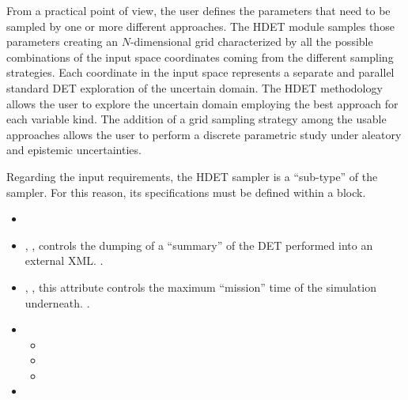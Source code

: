 From a practical point of view, the user defines the parameters that need to be
sampled by one or more different approaches.
%
The HDET module samples those parameters creating an $N$-dimensional grid
characterized by all the possible combinations of the input space coordinates
coming from the different sampling strategies.
%
Each coordinate in the input space represents a separate and parallel standard
DET exploration of the uncertain domain.
%
The HDET methodology allows the user to explore the uncertain domain
employing the best approach for each variable kind.
%
The addition of a grid sampling strategy among the usable approaches allows the
user to perform a discrete parametric study under aleatory and epistemic
uncertainties.

Regarding the input requirements, the HDET sampler is a ``sub-type'' of the\\
 sampler.
%
For this reason, its specifications must be defined within a
 block.
%
\attrsIntro

\begin{itemize}
  \itemsep0em
  \item \nameDescription
  \item {}, ,
    controls the dumping of a ``summary'' of the DET performed into an external
    XML.
    .
  \item {}, , this
    attribute controls the maximum ``mission'' time of the simulation
    underneath.
    .
\end{itemize}


\begin{itemize}
  \item \variableDescription
  \variableChildrenIntro
  \begin{itemize}
    \item \distributionDescription
    \item \functionDescription
    \item \gridDescription
  \end{itemize}
 \item \constantVariablesDescription
\end{itemize}

